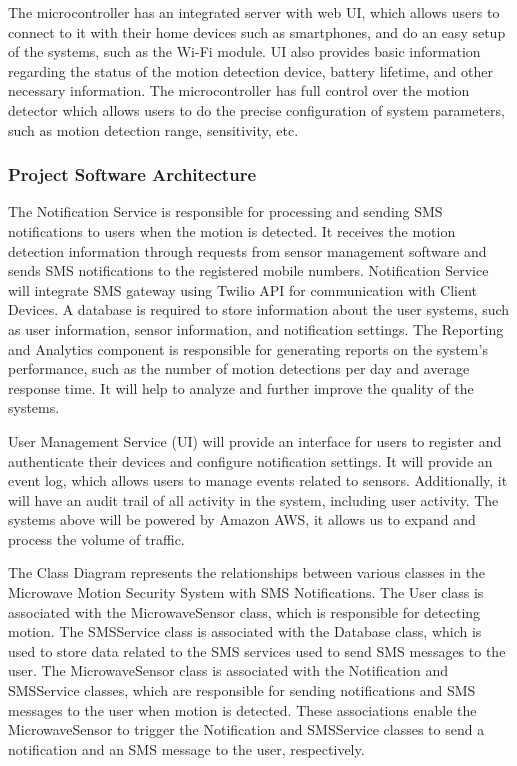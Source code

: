 The microcontroller has an integrated server with web UI, which allows users
to connect to it with their home devices such as smartphones, and do an easy setup
of the systems, such as the Wi-Fi module. %
UI also provides basic information regarding the status of the motion detection device, battery lifetime, and other necessary
information. %
The microcontroller has full control over the motion detector which allows users to do the precise configuration of system parameters, such as motion
detection range, sensitivity, etc. %



\subsubsection{Project Software Architecture}

The Notification Service is responsible for processing and sending SMS notifications
to users when the motion is detected. %
It receives the motion detection information through requests from sensor management software and sends SMS notifications to the
registered mobile numbers. %
Notification Service will integrate SMS gateway using Twilio API for communication with Client Devices.
A database is required to store information about the user systems, such as user information, sensor information,
and notification settings. %
The Reporting and Analytics component is responsible for generating reports on the system’s performance, such as the number of motion
detections per day and average response time. %
It will help to analyze and further improve the quality of the systems. %



User Management Service (UI) will provide an interface for users to register and
authenticate their devices and configure notification settings. %
It will provide an event log, which allows users to manage events related to sensors. %
Additionally, it will have an audit trail of all activity in the system, including user activity. %
The systems above will be powered by Amazon AWS, it allows us to expand and process
the volume of traffic. %



The Class Diagram represents the relationships between various classes in the
Microwave Motion Security System with SMS Notifications. %
The User class is associated with the MicrowaveSensor class, which is responsible for detecting motion. %
The SMSService class is associated with the Database class, which is used to store
data related to the SMS services used to send SMS messages to the user. %
The MicrowaveSensor class is associated with the Notification and SMSService classes,
which are responsible for sending notifications and SMS messages to the user when
motion is detected. %
These associations enable the MicrowaveSensor to trigger the Notification and SMSService classes to send a notification and an SMS message
to the user, respectively. %

